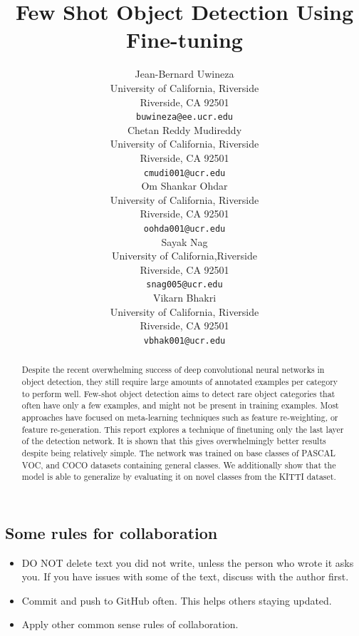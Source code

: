 \documentclass{article}
\title{Few Shot Object Detection Using Fine-tuning}
\author{%
  Jean-Bernard Uwineza 
  \\
  University of California, Riverside\\
  Riverside, CA 92501 \\
  \texttt{buwineza@ee.ucr.edu} \\
  \And
  Chetan Reddy Mudireddy \\
  University of California, Riverside \\
  Riverside, CA 92501 \\
  \texttt{cmudi001@ucr.edu} \\
  \AND
  Om Shankar Ohdar \\
  University of California, Riverside \\
  Riverside, CA 92501 \\
  \texttt{oohda001@ucr.edu} \\
  \And
  Sayak Nag \\
  University of California,Riverside \\
  Riverside, CA 92501 \\
  \texttt{snag005@ucr.edu} \\
  \And
  Vikarn Bhakri \\
  University of California, Riverside \\
  Riverside, CA 92501 \\
  \texttt{vbhak001@ucr.edu} \\
}
\begin{document}
\maketitle

\begin{abstract} 

Despite the recent overwhelming success of deep convolutional neural networks in  
object detection, they  still require large amounts of annotated examples per category  
to perform well. Few-shot object detection aims to detect rare object categories that 
often have only a few examples, and might not be present in training examples. 
Most approaches have focused on meta-learning techniques such as feature re-weighting, 
or feature re-generation. 
This report explores a technique of finetuning only the last layer of the detection network. 
It is shown that this  gives overwhelmingly better results despite being relatively simple. 
The network was trained on base classes of PASCAL VOC, and COCO datasets containing general classes. 
We additionally show that the model is able to generalize by evaluating it on novel 
classes from the KITTI dataset. 
\end{abstract}

\subsection{Some rules for collaboration} %

\begin{itemize}
  \item DO NOT delete text you did not write, unless the person who wrote it asks you. 
  If you have issues with some of the text, discuss with the author first. 
 
  \item Commit and push to GitHub often. This helps others staying updated. 

  \item Apply other common sense rules of collaboration.

\end{itemize}
\end{document}
